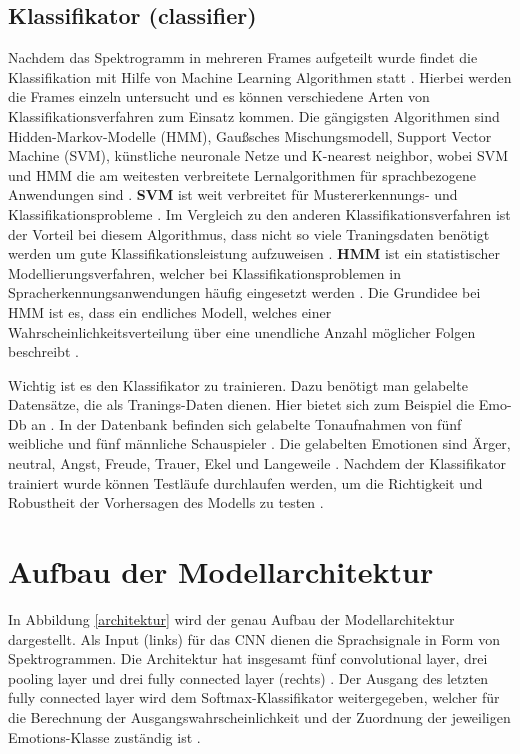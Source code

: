 \subsection{Klassifikator (classifier)}
Nachdem das Spektrogramm in mehreren Frames aufgeteilt wurde findet die Klassifikation mit Hilfe von Machine Learning Algorithmen statt \cite{badshah2019deep}. Hierbei werden die Frames einzeln untersucht und es können verschiedene Arten von Klassifikationsverfahren zum Einsatz kommen. Die gängigsten Algorithmen sind Hidden-Markov-Modelle (HMM), Gaußsches Mischungsmodell, Support Vector Machine (SVM), künstliche neuronale Netze und K-nearest neighbor, wobei SVM und HMM die am weitesten verbreitete Lernalgorithmen für sprachbezogene Anwendungen sind \cite{badshah2019deep}. \newline
\textbf{SVM} ist weit verbreitet für Mustererkennungs- und Klassifikationsprobleme \cite{svm}. Im Vergleich zu den anderen Klassifikationsverfahren ist der Vorteil bei diesem  Algorithmus, dass nicht so viele Traningsdaten benötigt werden um gute Klassifikationsleistung aufzuweisen \cite{svm}.
\newline
\textbf{HMM} ist ein statistischer Modellierungsverfahren, welcher bei Klassifikationsproblemen in Spracherkennungsanwendungen häufig eingesetzt werden \cite{HMM}. Die Grundidee bei HMM ist es, dass ein endliches Modell, welches einer Wahrscheinlichkeitsverteilung über eine unendliche Anzahl möglicher Folgen beschreibt \cite{HMM}.

Wichtig ist es den Klassifikator zu trainieren. Dazu benötigt man gelabelte Datensätze, die als Tranings-Daten dienen. Hier bietet sich zum Beispiel die Emo-Db an \cite{burkhardt2005database}. In der Datenbank befinden sich gelabelte Tonaufnahmen von fünf weibliche und fünf männliche Schauspieler \cite{burkhardt2005database}. Die gelabelten Emotionen sind Ärger, neutral, Angst, Freude, Trauer, Ekel und Langeweile \cite{burkhardt2005database}. Nachdem der Klassifikator trainiert wurde können Testläufe durchlaufen werden, um die Richtigkeit und Robustheit der Vorhersagen des Modells zu testen \cite{elearning}.

\section{Aufbau der Modellarchitektur}
In Abbildung \ref{architektur} wird der genau Aufbau der Modellarchitektur dargestellt. Als Input (links) für das CNN dienen die Sprachsignale in Form von Spektrogrammen. Die Architektur hat insgesamt fünf convolutional layer, drei pooling layer und drei fully connected layer (rechts) \cite{badshah2019deep}. Der Ausgang des letzten fully connected layer wird dem Softmax-Klassifikator weitergegeben, welcher für die Berechnung der Ausgangswahrscheinlichkeit und der Zuordnung der jeweiligen Emotions-Klasse zuständig ist \cite{badshah2019deep}. 

